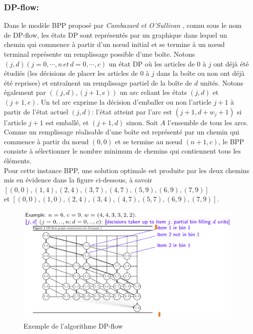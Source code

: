 \documentclass[class=report, crop=false]{standalone}
\begin{document}
        \subsubsection*{DP-flow:}
        Dans le modèle BPP proposé par \emph{Cambazard et O’Sullivan} \cite{delorme2016bin}, connu sous le nom de DP-flow, les états DP sont représentés par un graphique dans
        lequel un chemin qui commence à partir d'un nœud initial et se termine à un nœud terminal représente un remplissage possible d'une boîte. Notons 
        \((j, d) (j = 0, \cdots, n \, et \, d = 0, \cdots, c)\) un état DP où les articles de \(0\) à \(j\) ont déjà été étudiés (les décisions de placer les articles de \(0\) à \(j\) dans la boîte ou non 
        ont déjà été reprises) et entraînent un remplissage partiel de la boîte de \(d\) unités. Notons également par \(((j, d), (j + 1, e))\) un arc reliant les états \((j, d)\) 
        et \((j + 1, e)\). Un tel arc exprime la décision d'emballer ou non l'article \(j + 1\) à partir de l'état actuel \((j, d)\): l'état atteint par l'arc est \((j + 1, d + w_j + 1)\) si l'article \(j + 1\) est emballé, et \((j + 1, d)\) sinon.
        Soit \(A\) l'ensemble de tous les arcs. Comme un remplissage réalisable d’une boîte est représenté par un chemin qui commence à partir du nœud \((0, 0)\) et se termine au nœud \((n + 1, c)\), le BPP consiste à sélectionner le nombre minimum de chemins qui contiennent tous les éléments. \\
        Pour cette instance BPP, une solution optimale est produite par les deux chemins mis en évidence dans la figure ci-dessous, à savoir \\\([(0,0), (1,4), (2,4), (3,7), (4,7), (5,9), (6,9), (7,9)]\) \\
        et \([(0,0), (1,0), (2,4), (3,4), (4,7), (5,7), (6,9), (7,9)]\).
        \begin{figure}[h!]
            \includegraphics[width=13.5cm]{../figures/DP-flow.png}
            \caption{Exemple de l'algorithme DP-flow}
        \end{figure}
\end{document}
